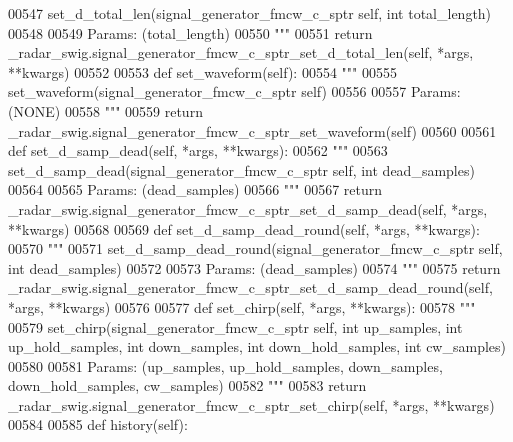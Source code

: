 \begin{DoxyCode}
{{{{00547 \textcolor{stringliteral}{        set\_d\_total\_len(signal\_generator\_fmcw\_c\_sptr self, int total\_length)}
00548 \textcolor{stringliteral}{}
00549 \textcolor{stringliteral}{        Params: (total\_length)}
00550 \textcolor{stringliteral}{        """}
00551         \textcolor{keywordflow}{return} \_radar\_swig.signal\_generator\_fmcw\_c\_sptr\_set\_d\_total\_len(self, *args, **kwargs)
00552 
00553     \textcolor{keyword}{def }set_waveform(self):
00554         \textcolor{stringliteral}{"""}
00555 \textcolor{stringliteral}{        set\_waveform(signal\_generator\_fmcw\_c\_sptr self)}
00556 \textcolor{stringliteral}{}
00557 \textcolor{stringliteral}{        Params: (NONE)}
00558 \textcolor{stringliteral}{        """}
00559         \textcolor{keywordflow}{return} \_radar\_swig.signal\_generator\_fmcw\_c\_sptr\_set\_waveform(self)
00560 
00561     \textcolor{keyword}{def }set_d_samp_dead(self, *args, **kwargs):
00562         \textcolor{stringliteral}{"""}
00563 \textcolor{stringliteral}{        set\_d\_samp\_dead(signal\_generator\_fmcw\_c\_sptr self, int dead\_samples)}
00564 \textcolor{stringliteral}{}
00565 \textcolor{stringliteral}{        Params: (dead\_samples)}
00566 \textcolor{stringliteral}{        """}
00567         \textcolor{keywordflow}{return} \_radar\_swig.signal\_generator\_fmcw\_c\_sptr\_set\_d\_samp\_dead(self, *args, **kwargs)
00568 
00569     \textcolor{keyword}{def }set_d_samp_dead_round(self, *args, **kwargs):
00570         \textcolor{stringliteral}{"""}
00571 \textcolor{stringliteral}{        set\_d\_samp\_dead\_round(signal\_generator\_fmcw\_c\_sptr self, int dead\_samples)}
00572 \textcolor{stringliteral}{}
00573 \textcolor{stringliteral}{        Params: (dead\_samples)}
00574 \textcolor{stringliteral}{        """}
00575         \textcolor{keywordflow}{return} \_radar\_swig.signal\_generator\_fmcw\_c\_sptr\_set\_d\_samp\_dead\_round(self, *args, **kwargs)
00576 
00577     \textcolor{keyword}{def }set_chirp(self, *args, **kwargs):
00578         \textcolor{stringliteral}{"""}
00579 \textcolor{stringliteral}{        set\_chirp(signal\_generator\_fmcw\_c\_sptr self, int up\_samples, int up\_hold\_samples, int down\_samples,
       int down\_hold\_samples, int cw\_samples)}
00580 \textcolor{stringliteral}{}
00581 \textcolor{stringliteral}{        Params: (up\_samples, up\_hold\_samples, down\_samples, down\_hold\_samples, cw\_samples)}
00582 \textcolor{stringliteral}{        """}
00583         \textcolor{keywordflow}{return} \_radar\_swig.signal\_generator\_fmcw\_c\_sptr\_set\_chirp(self, *args, **kwargs)
00584 
00585     \textcolor{keyword}{def }history(self):
}}}}
\end{DoxyCode}
